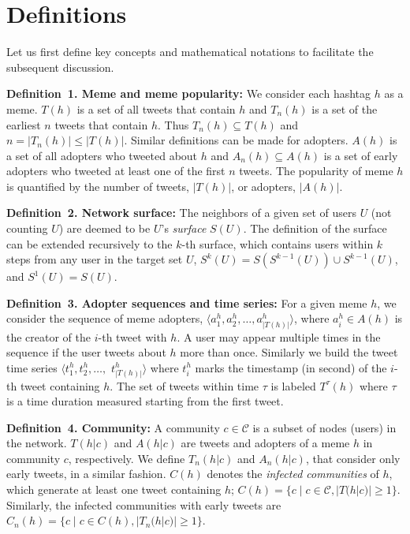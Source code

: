 \documentclass[letterpaper]{article}
\begin{document}
\section{Definitions}

Let us first define key concepts and mathematical notations to facilitate the subsequent discussion.

\noindent \textbf{Definition~1. Meme and meme popularity:}
We consider each hashtag $h$ as a meme.
$T(h)$ is a set of all tweets that contain $h$ and $T_n(h)$ is a set of the earliest $n$ tweets that contain $h$.
Thus $T_n(h) \subseteq T(h)$ and $n = |T_n(h)| \leq |T(h)|$.
Similar definitions can be made for adopters.
$A(h)$ is a set of all adopters who tweeted about $h$ and $A_n(h) \subseteq A(h)$ is a set of early adopters who tweeted at least one of the first $n$ tweets.
The popularity of meme $h$ is quantified by the number of tweets, $|T(h)|$, or adopters, $|A(h)|$.

\noindent \textbf{Definition~2. Network surface:}
The neighbors of a given set of users $U$ (not counting $U$) are deemed to be $U$'s \emph{surface} $S(U)$.
The definition of the surface can be extended recursively to the $k$-th surface, which contains users within $k$ steps from any user in the target set $U$, $S^k(U) = S(S^{k-1}(U)) \cup S^{k-1}(U)$, and $S^1(U) = S(U)$.

\noindent \textbf{Definition~3. Adopter sequences and time series:}
For a given meme $h$, we consider the sequence of meme adopters, $\langle a_1^h, a_2^h, \dots, a_{|T(h)|}^h \rangle$, where $a_i^h \in A(h)$ is the creator of the $i$-th tweet with $h$.
A user may appear multiple times in the sequence if the user tweets about $h$ more than once.
Similarly we build the tweet time series $\langle t_1^h, t_2^h, \dots, $ $t_{|T(h)|}^h \rangle$ where $t_i^h$ marks the timestamp (in second) of the $i$-th tweet containing $h$.
The set of tweets within time $\tau$ is labeled $T^{\tau}(h)$ where $\tau$ is a time duration measured starting from the first tweet.


\noindent \textbf{Definition~4. Community:}
A community $c \in \mathcal{C}$ is a subset of nodes (users) in the network.
$T(h|c)$ and $A(h|c)$ are tweets and adopters of a meme $h$ in community $c$, respectively.
We define $T_n(h|c)$ and $A_n(h|c)$, that consider only early tweets, in a similar fashion.
$C(h)$ denotes the \emph{infected communities} of $h$, which generate at least one tweet containing $h$; $C(h) = \{c \; | \; c \in \mathcal{C}, |T(h|c)| \geq 1 \}$.
Similarly, the infected communities with early tweets are $C_n(h) = \{ c \; | \; c \in C(h), |T_n(h|c)| \geq 1 \}$.
\end{document}
